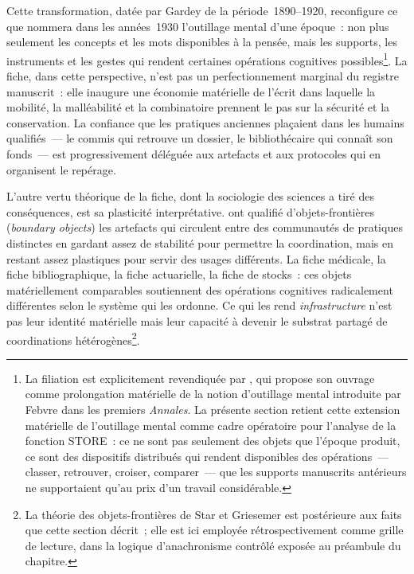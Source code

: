 %
Cette transformation, datée par Gardey de la période~1890--1920, reconfigure ce que \textcite{febvre_outillage_1938} nommera dans les années~1930 l'\og outillage mental\fg{} d'une époque~: non plus seulement les concepts et les mots disponibles à la pensée, mais les supports, les instruments et les gestes qui rendent certaines opérations cognitives possibles\footnote{La filiation est explicitement revendiquée par \textcite[introduction]{gardey_ecrire_2008}, qui propose son ouvrage comme \og prolongation matérielle\fg{} de la notion d'outillage mental introduite par Febvre dans les premiers \emph{Annales}. La présente section retient cette extension matérielle de l'outillage mental comme cadre opératoire pour l'analyse de la fonction STORE~: ce ne sont pas seulement des objets que l'époque produit, ce sont des dispositifs distribués qui rendent disponibles des opérations~--- classer, retrouver, croiser, comparer~--- que les supports manuscrits antérieurs ne supportaient qu'au prix d'un travail considérable.}. La fiche, dans cette perspective, n'est pas un perfectionnement marginal du registre manuscrit~: elle inaugure une économie matérielle de l'écrit dans laquelle la mobilité, la malléabilité et la combinatoire prennent le pas sur la sécurité et la conservation. La confiance que les pratiques anciennes plaçaient dans les humains qualifiés~--- le commis qui retrouve un dossier, le bibliothécaire qui connaît son fonds~--- est progressivement déléguée aux artefacts et aux protocoles qui en organisent le repérage.

L'autre vertu théorique de la fiche, dont la sociologie des sciences a tiré des conséquences, est sa plasticité interprétative. \textcite{star_griesemer_1989} ont qualifié d'\og objets-frontières\fg{} (\emph{boundary objects}) les artefacts qui circulent entre des communautés de pratiques distinctes en gardant assez de stabilité pour permettre la coordination, mais en restant assez plastiques pour servir des usages différents. La fiche médicale, la fiche bibliographique, la fiche actuarielle, la fiche de stocks~: ces objets matériellement comparables soutiennent des opérations cognitives radicalement différentes selon le système qui les ordonne. Ce qui les rend \emph{infrastructure} n'est pas leur identité matérielle mais leur capacité à devenir le substrat partagé de coordinations hétérogènes\footnote{La théorie des objets-frontières de Star et Griesemer est postérieure aux faits que cette section décrit~; elle est ici employée rétrospectivement comme grille de lecture, dans la logique d'anachronisme contrôlé exposée au préambule du chapitre.}.


